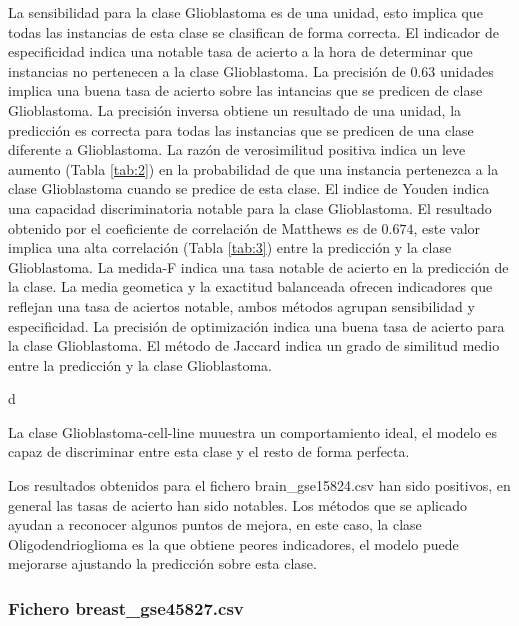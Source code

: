 \bigbreak

La sensibilidad para la clase Glioblastoma es de una unidad, esto implica que todas las instancias de esta clase se clasifican de forma correcta. El indicador de especificidad indica una notable tasa de acierto a la hora de determinar que instancias no pertenecen a la clase Glioblastoma. La precisión de $0.63$ unidades implica una buena tasa de acierto sobre las intancias que se predicen de clase Glioblastoma. La precisión inversa obtiene un resultado de una unidad, la predicción es correcta para todas las instancias que se predicen de una clase diferente a Glioblastoma. La razón de verosimilitud positiva indica un leve aumento (Tabla \ref{tab:2}) en la probabilidad de que una instancia pertenezca a la clase Glioblastoma cuando se predice de esta clase. El indice de Youden indica una capacidad discriminatoria notable para la clase Glioblastoma. El resultado obtenido por el coeficiente de correlación de Matthews es de $0.674$, este valor implica una alta correlación (Tabla \ref{tab:3}) entre la predicción y la clase Glioblastoma. La medida-F indica una tasa notable de acierto en la predicción de la clase. La media geometica y la exactitud balanceada ofrecen indicadores que reflejan una tasa de aciertos notable, ambos métodos agrupan sensibilidad y especificidad. La precisión de optimización indica una buena tasa de acierto para la clase Glioblastoma. El método de Jaccard indica un grado de similitud medio entre la predicción y la clase Glioblastoma.

\bigbreak

d

\bigbreak

La clase Glioblastoma-cell-line muuestra un comportamiento ideal, el modelo es capaz de discriminar entre esta clase y el resto de forma perfecta.

\bigbreak

Los resultados obtenidos para el fichero brain\_gse15824.csv han sido positivos, en general las tasas de acierto han sido notables. Los métodos que se aplicado ayudan a reconocer algunos puntos de mejora, en este caso, la clase Oligodendrioglioma es la que obtiene peores indicadores, el modelo puede mejorarse ajustando la predicción sobre esta clase.

\clearpage


\subsubsection{Fichero breast\_gse45827.csv}

